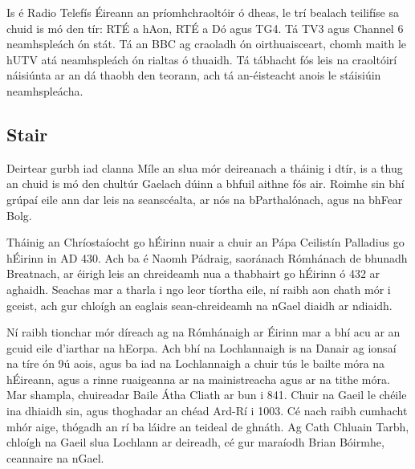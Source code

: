 \documentclass[a4paper,12pt]{article}
\theoremstyle{plain} %
\theoremstyle{definition} %
\theoremstyle{remark} %
\begin{document}
Is é Radio Telefís Éireann an príomhchraoltóir ó dheas, le trí bealach teilifíse sa chuid is mó den tír: RTÉ a hAon, RTÉ a Dó agus TG4. Tá TV3 agus Channel 6 neamhspleách ón stát. Tá an BBC ag craoladh ón oirthuaisceart, chomh maith le hUTV atá neamhspleách ón rialtas ó thuaidh. Tá tábhacht fós leis na craoltóirí náisiúnta ar an dá thaobh den teorann, ach tá an-éisteacht anois le stáisiúin neamhspleácha.

\subsection{Stair}

Deirtear gurbh iad clanna Míle an slua mór deireanach a tháinig i dtír, is a thug an chuid is mó den chultúr Gaelach dúinn a bhfuil aithne fós air. Roimhe sin bhí grúpaí eile ann dar leis na seanscéalta, ar nós na bParthalónach, agus na bhFear Bolg.

Tháinig an Chríostaíocht go hÉirinn nuair a chuir an Pápa Ceilistín Palladius go hÉirinn in AD 430. Ach ba é Naomh Pádraig, saoránach Rómhánach de bhunadh Breatnach, ar éirigh leis an chreideamh nua a thabhairt go hÉirinn ó 432 ar aghaidh. Seachas mar a tharla i ngo leor tíortha eile, ní raibh aon chath mór i gceist, ach gur chloígh an eaglais sean-chreideamh na nGael diaidh ar ndiaidh.

Ní raibh tionchar mór díreach ag na Rómhánaigh ar Éirinn mar a bhí acu ar an gcuid eile d'iarthar na hEorpa. Ach bhí na Lochlannaigh is na Danair ag ionsaí na tíre ón 9ú aois, agus ba iad na Lochlannaigh a chuir tús le bailte móra na hÉireann, agus a rinne ruaigeanna ar na mainistreacha agus ar na tithe móra. Mar shampla, chuireadar Baile Átha Cliath ar bun i 841. Chuir na Gaeil le chéile ina dhiaidh sin, agus thoghadar an chéad Ard-Rí i 1003. Cé nach raibh cumhacht mhór aige, thógadh an rí ba láidre an teideal de ghnáth. Ag Cath Chluain Tarbh, chloígh na Gaeil slua Lochlann ar deireadh, cé gur maraíodh Brian Bóirmhe, ceannaire na nGael.
\end{document}
